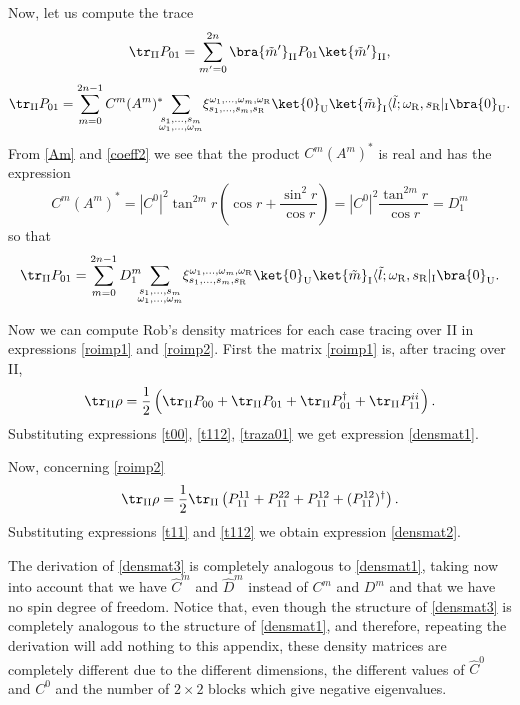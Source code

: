 Now, let us compute the trace
\begin{equation}\label{traza01pre}
\tr_{\text{II}} P_{01}=\sum_{m'=0}^{2n}\bra{\tilde m'}_\text{II}P_{01}\ket{\tilde m'}_\text{II},
\end{equation}
\begin{equation}\label{traza01pre2}
\tr_{\text{II}} P_{01}=\sum_{m=0}^{2n-1}C^m (A^{m})^*\!\!\!\sum_{\substack{s_1,\dots,s_{m}\\\omega_1,\dots,\omega_{m}}}\!\xi_{s_1,\dots,s_m,s_\text{R}}^{\omega_1,\dots,\omega_m,\omega_\text{R}}\ket{0}_{\text{U}}\ket{\tilde m}_\text{I}\langle{\tilde l;\omega_\text{R},s_\text{R}}|_{\text{I}}\bra{0}_{\text{U}}.
\end{equation}
From \eqref{Am} and \eqref{coeff2} we see that the product $C^m(A^m)^*$ is real and has the expression
\begin{equation}
C^m(A^m)^*=|C^0|^2\tan^{2m}r\left(\cos r+\frac{\sin^2 r}{\cos r}\right)=|C^0|^2\frac{\tan^{2m}r}{\cos r}=D^m_1
\end{equation}
so that
\begin{equation}\label{traza01}
 \tr_{\text{II}} P_{01}=\sum_{m=0}^{2n-1}D^m_1\!\!\!\sum_{\substack{s_1,\dots,s_{m}\\\omega_1,\dots,\omega_{m}}}\!\xi_{s_1,\dots,s_m,s_\text{R}}^{\omega_1,\dots,\omega_m,\omega_\text{R}}\ket{0}_{\text{U}}\ket{\tilde m}_\text{I}\langle{\tilde l;\omega_\text{R},s_\text{R}}|_{\text{I}}\bra{0}_{\text{U}}.
\end{equation}

Now we can compute Rob's density matrices for each case tracing over II in expressions \eqref{roimp1} and \eqref{roimp2}. First the matrix \eqref{roimp1} is, after tracing over II, 
\begin{equation}
\tr_{\text{II}}\rho=\frac12\left(\tr_{\text{II}}P_{00}+\tr_{\text{II}}P_{01}+\tr_{\text{II}}P_{01}^\dagger+\tr_{\text{II}}P^{ii}_{11}\right).
\end{equation}
Substituting expressions \eqref{t00}, \eqref{t112}, \eqref{traza01} we get expression \eqref{densmat1}.

Now, concerning \eqref{roimp2}
\begin{equation}
\tr_{\text{II}} \rho=\frac12\tr_{\text{II}}\left( P^{11}_{11}+P^{22}_{11}+P^{12}_{11}+(P^{12}_{11})^\dagger\right).
\end{equation}
Substituting expressions \eqref{t11} and \eqref{t112} we obtain expression \eqref{densmat2}.

The derivation of \eqref{densmat3} is completely analogous to \eqref{densmat1}, taking now into account that we have $\hat C^m$ and $\hat D^m$ instead of $C^m$ and $D^m$ and that we have no spin degree of freedom. Notice that, even though the structure of \eqref{densmat3} is completely analogous to the structure of \eqref{densmat1}, and therefore, repeating the derivation will add nothing to this appendix,  these density matrices are completely different due to the different dimensions, the different values of $\hat C^0$ and $C^0$ and the number of $2\times 2$ blocks which give negative eigenvalues. 



\cleardoublepage
